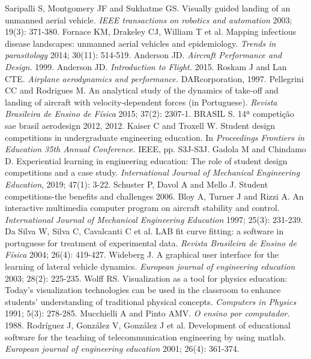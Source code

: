\documentclass[10pt]{SelfArx} %
\begin{document}
\begin{thebibliography}{99}
 Saripalli S, Montgomery JF and Sukhatme GS. Visually guided landing of an unmanned aerial vehicle. \textit{IEEE transactions on robotics and automation} 2003; 19(3): 371-380.
 Fornace KM, Drakeley CJ, William T et al. Mapping infectious disease landscapes: unmanned aerial vehicles and epidemiology. \textit{Trends in parasitology} 2014; 30(11): 514-519.
 Anderson JD. \textit{Aircraft Performance and Design.} 1999.
 Anderson JD. \textit{Introduction to Flight.} 2015.
 Roskam J and Lan CTE. \textit{Airplane aerodynamics and performance.} DARcorporation, 1997.
 Pellegrini CC and Rodrigues M. An analytical study of the dynamics of take-off and landing of aircraft with velocity-dependent forces (in Portuguese). \textit{Revista Brasileira de Ensino de Física} 2015; 37(2): 2307-1.
 BRASIL S. 14ª competição sae brasil aerodesign 2012, 2012.
 Kaiser C and Troxell W. Student design competitions in undergraduate engineering education. In \textit{Proceedings Frontiers in Education 35th Annual Conference.} IEEE, pp. S3J-S3J.
 Gadola M and Chindamo D. Experiential learning in engineering education: The role of student design competitions and a case study. \textit{International Journal of Mechanical Engineering Education}, 2019; 47(1): 3-22.
 Schuster P, Davol A and Mello J. Student competitions-the benefits and challenges 2006.
 Bloy A, Turner J and Rizzi A. An interactive multimedia computer program on aircraft stability and control. \textit{International Journal of Mechanical Engineering Education} 1997; 25(3): 231-239.
 Da Silva W, Silva C, Cavalcanti C et al. LAB fit curve fitting: a software in portuguese for treatment of experimental data. \textit{Revista Brasileira de Ensino de Física} 2004; 26(4): 419-427.
 Wideberg J. A graphical user interface for the learning of lateral vehicle dynamics. \textit{European journal of engineering education} 2003; 28(2): 225-235.
 Wolff RS. Visualization as a tool for physics education: Today's visualization technologies can be used in the classroom to enhance students' understanding of traditional physical concepts. \textit{Computers in Physics} 1991; 5(3): 278-285.
 Mucchielli A and Pinto AMV. \textit{O ensino por computador.} 1988.
 Rodríguez J, González V, González J et al. Development of educational software for the teaching of telecommunication engineering by using matlab. \textit{European journal of engineering education} 2001; 26(4): 361-374.

\end{thebibliography}
\end{document}
